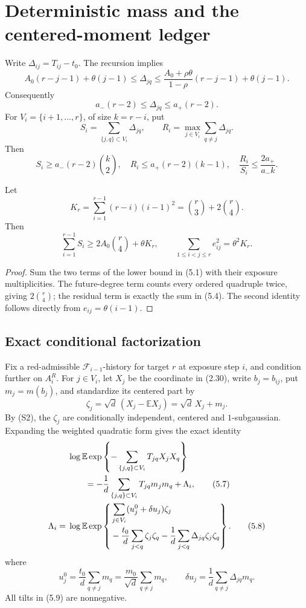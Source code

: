 \section{Deterministic mass and the centered-moment ledger}\label{sec:ledger}

Write \(\Delta_{ij}=T_{ij}-t_0\).  The recursion implies
\[
A_0(r-j-1)+\theta(j-1)
\le\Delta_{jq}
\le\frac{A_0+\rho\theta}{1-\rho}(r-j-1)+\theta(j-1).
\tag{5.1}
\]
Consequently
\[
 a_-(r-2)\le\Delta_{jq}\le a_+(r-2).
\tag{5.2}
\]
For \(V_i=\{i+1,\ldots,r\}\), of size \(k=r-i\), put
\[
 S_i=\sum_{\{j,q\}\subset V_i}\Delta_{jq},\qquad
 R_i=\max_{j\in V_i}\sum_{q\ne j}\Delta_{jq}.
\]
Then
\[
S_i\ge a_-(r-2)\binom k2,\quad
R_i\le a_+(r-2)(k-1),\quad
\frac{R_i}{S_i}\le\frac{2a_+}{a_-k}.
\tag{5.3}
\]

\begin{lemma}\label{lem:multiplicity}
Let
\[
 K_r=\sum_{i=1}^{r-1}(r-i)(i-1)^2
 =\binom r3+2\binom r4.
\tag{5.4}
\]
Then
\[
 \sum_{i=1}^{r-1}S_i\ge2A_0\binom r4+\theta K_r,
 \qquad
 \sum_{1\le i<j\le r}e_{ij}^2=\theta^2K_r.
\tag{5.5}
\]
\end{lemma}

\begin{proof}
Sum the two terms of the lower bound in (5.1) with their exposure
multiplicities.  The future-degree term counts every ordered quadruple twice,
giving \(2\binom r4\); the residual term is exactly the sum in (5.4).
The second identity follows directly from \(e_{ij}=\theta(i-1)\).
\end{proof}

\subsection{Exact conditional factorization}

Fix a red-admissible \(\mathcal F_{i-1}\)-history for target \(r\) at
exposure step \(i\), and condition further on \(A_i^R\).  For \(j\in V_i\), let
\(X_j\) be the coordinate in (2.30), write \(b_j=b_{ij}\), put
\(m_j=m(b_j)\), and standardize its centered
part by
\[
 \zeta_j=\sqrt d\,(X_j-\mathbb EX_j)=\sqrt d\,X_j+m_j.
\tag{5.6}
\]
By (S2), the \(\zeta_j\) are conditionally independent, centered and
\(1\)-subgaussian.  Expanding the weighted quadratic form gives the exact
identity
\begin{align}
&\log\mathbb E\exp\left\{
-\sum_{\{j,q\}\subset V_i}T_{jq}X_jX_q\right\}\notag\\
&\qquad=-\frac1d\sum_{\{j,q\}\subset V_i}T_{jq}m_jm_q
+\Lambda_i,\tag{5.7}\\
\Lambda_i={}&\log\mathbb E\exp\left\{
\begin{aligned}
&\sum_{j\in V_i}(u_j^0+\delta u_j)\zeta_j\\
&-\frac{t_0}{d}\sum_{j<q}\zeta_j\zeta_q
-\frac1d\sum_{j<q}\Delta_{jq}\zeta_j\zeta_q
\end{aligned}\right\}.\tag{5.8}
\end{align}
where
\[
 u_j^0=\frac{t_0}{d}\sum_{q\ne j}m_q
 =\frac{m_0}{\sqrt d}\sum_{q\ne j}m_q,\qquad
 \delta u_j=\frac1d\sum_{q\ne j}\Delta_{jq}m_q.
\tag{5.9}
\]
All tilts in (5.9) are nonnegative.

